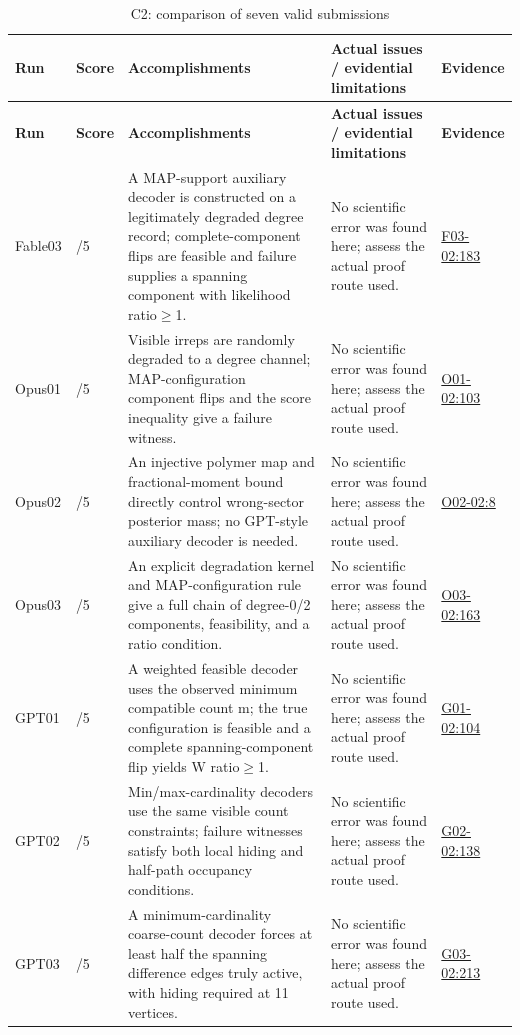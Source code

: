 \documentclass[11pt,a4paper]{article}
\begin{document}
{\fontsize{9.0}{12.6}\selectfont
\setlength{\tabcolsep}{2.5pt}
\begin{longtable}{>{\raggedright\arraybackslash}p{}>{\raggedright\arraybackslash}p{}>{\raggedright\arraybackslash}p{}>{\raggedright\arraybackslash}p{}>{\raggedright\arraybackslash}p{}}
\caption{C2: comparison of seven valid submissions}\\
\toprule
\textbf{Run} & \textbf{Score} & \textbf{Accomplishments} & \textbf{Actual issues /\allowbreak{} evidential limitations} & \textbf{Evidence}\tabularnewline
\midrule
\endfirsthead
\toprule
\textbf{Run} & \textbf{Score} & \textbf{Accomplishments} & \textbf{Actual issues /\allowbreak{} evidential limitations} & \textbf{Evidence}\tabularnewline
\midrule
\endhead
{}Fable03 & 5/\allowbreak{}5 & A MAP-support auxiliary decoder is constructed on a legitimately degraded degree record; complete-component flips are feasible and failure supplies a spanning component with likelihood ratio\ensuremath{\geq}1. & No scientific error was found here; assess the actual proof route used. & \hyperref[src:F03-02]{F03-02:183}\tabularnewline
{}Opus01 & 5/\allowbreak{}5 & Visible irreps are randomly degraded to a degree channel; MAP-configuration component flips and the score inequality give a failure witness. & No scientific error was found here; assess the actual proof route used. & \hyperref[src:O01-02]{O01-02:103}\tabularnewline
{}Opus02 & 5/\allowbreak{}5 & An injective polymer map and fractional-moment bound directly control wrong-sector posterior mass; no GPT-style auxiliary decoder is needed. & No scientific error was found here; assess the actual proof route used. & \hyperref[src:O02-02]{O02-02:8}\tabularnewline
{}Opus03 & 5/\allowbreak{}5 & An explicit degradation kernel and MAP-configuration rule give a full chain of degree-0/\allowbreak{}2 components,\allowbreak{} feasibility,\allowbreak{} and a ratio condition. & No scientific error was found here; assess the actual proof route used. & \hyperref[src:O03-02]{O03-02:163}\tabularnewline
{}GPT01 & 5/\allowbreak{}5 & A weighted feasible decoder uses the observed minimum compatible count m; the true configuration is feasible and a complete spanning-component flip yields W ratio\ensuremath{\geq}1. & No scientific error was found here; assess the actual proof route used. & \hyperref[src:G01-02]{G01-02:104}\tabularnewline
{}GPT02 & 5/\allowbreak{}5 & Min/\allowbreak{}max-cardinality decoders use the same visible count constraints; failure witnesses satisfy both local hiding and half-path occupancy conditions. & No scientific error was found here; assess the actual proof route used. & \hyperref[src:G02-02]{G02-02:138}\tabularnewline
{}GPT03 & 5/\allowbreak{}5 & A minimum-cardinality coarse-count decoder forces at least half the spanning difference edges truly active,\allowbreak{} with hiding required at 11 vertices. & No scientific error was found here; assess the actual proof route used. & \hyperref[src:G03-02]{G03-02:213}\tabularnewline
\bottomrule
\end{longtable}
}
\end{document}
